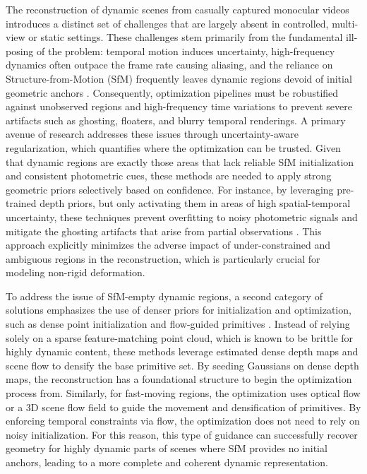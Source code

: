 \documentclass[11pt,a4paper]{article}
\begin{document}
The reconstruction of dynamic scenes from casually captured monocular videos introduces a distinct set of challenges that are largely absent in controlled, multi-view or static settings. These challenges stem primarily from the fundamental ill-posing of the problem: temporal motion induces uncertainty, high-frequency dynamics often outpace the frame rate causing aliasing, and the reliance on Structure-from-Motion (SfM) frequently leaves dynamic regions devoid of initial geometric anchors \cite{arxiv:2404.12547v2,arxiv:2603.20714v3,arxiv:2510.17479v1}. Consequently, optimization pipelines must be robustified against unobserved regions and high-frequency time variations to prevent severe artifacts such as ghosting, floaters, and blurry temporal renderings. A primary avenue of research addresses these issues through uncertainty-aware regularization, which quantifies where the optimization can be trusted. Given that dynamic regions are exactly those areas that lack reliable SfM initialization and consistent photometric cues, these methods are needed to apply strong geometric priors selectively based on confidence. For instance, by leveraging pre-trained depth priors, but only activating them in areas of high spatial-temporal uncertainty, these techniques prevent overfitting to noisy photometric signals and mitigate the ghosting artifacts that arise from partial observations \cite{arxiv:2504.09129v1,arxiv:2506.02751v3}. This approach explicitly minimizes the adverse impact of under-constrained and ambiguous regions in the reconstruction, which is particularly crucial for modeling non-rigid deformation.

To address the issue of SfM-empty dynamic regions, a second category of solutions emphasizes the use of denser priors for initialization and optimization, such as dense point initialization and flow-guided primitives \cite{arxiv:2605.14880v1,arxiv:2504.13204v2}. Instead of relying solely on a sparse feature-matching point cloud, which is known to be brittle for highly dynamic content, these methods leverage estimated dense depth maps and scene flow to densify the base primitive set. By seeding Gaussians on dense depth maps, the reconstruction has a foundational structure to begin the optimization process from. Similarly, for fast-moving regions, the optimization uses optical flow or a 3D scene flow field to guide the movement and densification of primitives. By enforcing temporal constraints via flow, the optimization does not need to rely on noisy initialization. For this reason, this type of guidance can successfully recover geometry for highly dynamic parts of scenes where SfM provides no initial anchors, leading to a more complete and coherent dynamic representation.
\end{document}
